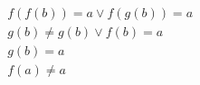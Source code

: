 \begin{align*}
%
& f(f(b)) = a \lor f(g(b)) = a
~\\~
& g(b)  \neq  g(b) \lor f(b) = a
~\\~
& g(b) = a
~\\~
& f(a)  \neq  a
%
\end{align*}
